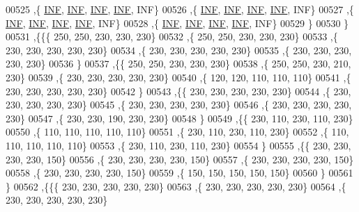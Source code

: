 \begin{DoxyCode}
00525    ,\{   \hyperlink{constants_8h_a12c2040f25d8e3a7b9e1c2024c618cb6}{INF},   \hyperlink{constants_8h_a12c2040f25d8e3a7b9e1c2024c618cb6}{INF},   \hyperlink{constants_8h_a12c2040f25d8e3a7b9e1c2024c618cb6}{INF},   \hyperlink{constants_8h_a12c2040f25d8e3a7b9e1c2024c618cb6}{INF},   INF\}
00526    ,\{   \hyperlink{constants_8h_a12c2040f25d8e3a7b9e1c2024c618cb6}{INF},   \hyperlink{constants_8h_a12c2040f25d8e3a7b9e1c2024c618cb6}{INF},   \hyperlink{constants_8h_a12c2040f25d8e3a7b9e1c2024c618cb6}{INF},   \hyperlink{constants_8h_a12c2040f25d8e3a7b9e1c2024c618cb6}{INF},   INF\}
00527    ,\{   \hyperlink{constants_8h_a12c2040f25d8e3a7b9e1c2024c618cb6}{INF},   \hyperlink{constants_8h_a12c2040f25d8e3a7b9e1c2024c618cb6}{INF},   \hyperlink{constants_8h_a12c2040f25d8e3a7b9e1c2024c618cb6}{INF},   \hyperlink{constants_8h_a12c2040f25d8e3a7b9e1c2024c618cb6}{INF},   INF\}
00528    ,\{   \hyperlink{constants_8h_a12c2040f25d8e3a7b9e1c2024c618cb6}{INF},   \hyperlink{constants_8h_a12c2040f25d8e3a7b9e1c2024c618cb6}{INF},   \hyperlink{constants_8h_a12c2040f25d8e3a7b9e1c2024c618cb6}{INF},   \hyperlink{constants_8h_a12c2040f25d8e3a7b9e1c2024c618cb6}{INF},   INF\}
00529    \}
00530   \}
00531  ,\{\{\{   250,   250,   230,   230,   230\}
00532    ,\{   250,   250,   230,   230,   230\}
00533    ,\{   230,   230,   230,   230,   230\}
00534    ,\{   230,   230,   230,   230,   230\}
00535    ,\{   230,   230,   230,   230,   230\}
00536    \}
00537   ,\{\{   250,   250,   230,   230,   230\}
00538    ,\{   250,   250,   230,   210,   230\}
00539    ,\{   230,   230,   230,   230,   230\}
00540    ,\{   120,   120,   110,   110,   110\}
00541    ,\{   230,   230,   230,   230,   230\}
00542    \}
00543   ,\{\{   230,   230,   230,   230,   230\}
00544    ,\{   230,   230,   230,   230,   230\}
00545    ,\{   230,   230,   230,   230,   230\}
00546    ,\{   230,   230,   230,   230,   230\}
00547    ,\{   230,   230,   190,   230,   230\}
00548    \}
00549   ,\{\{   230,   110,   230,   110,   230\}
00550    ,\{   110,   110,   110,   110,   110\}
00551    ,\{   230,   110,   230,   110,   230\}
00552    ,\{   110,   110,   110,   110,   110\}
00553    ,\{   230,   110,   230,   110,   230\}
00554    \}
00555   ,\{\{   230,   230,   230,   230,   150\}
00556    ,\{   230,   230,   230,   230,   150\}
00557    ,\{   230,   230,   230,   230,   150\}
00558    ,\{   230,   230,   230,   230,   150\}
00559    ,\{   150,   150,   150,   150,   150\}
00560    \}
00561   \}
00562  ,\{\{\{   230,   230,   230,   230,   230\}
00563    ,\{   230,   230,   230,   230,   230\}
00564    ,\{   230,   230,   230,   230,   230\}

\end{DoxyCode}
